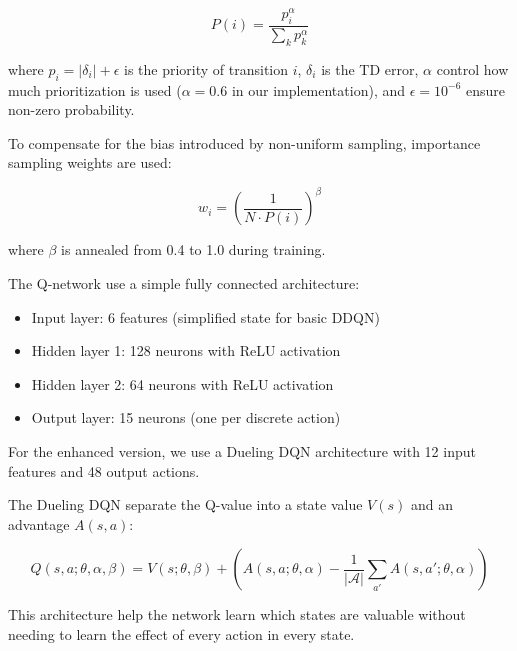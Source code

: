 \documentclass[12pt,a4paper]{article}
\begin{document}
\begin{equation}
    P(i) = \frac{p_i^{\alpha}}{\sum_k p_k^{\alpha}}
    \label{eq:per_prob}
\end{equation}

where $p_i = |\delta_i| + \epsilon$ is the priority of transition $i$, $\delta_i$ is the TD error, $\alpha$ control how much prioritization is used ($\alpha = 0.6$ in our implementation), and $\epsilon = 10^{-6}$ ensure non-zero probability.

To compensate for the bias introduced by non-uniform sampling, importance sampling weights are used:

\begin{equation}
    w_i = \left(\frac{1}{N \cdot P(i)}\right)^{\beta}
    \label{eq:is_weights}
\end{equation}

where $\beta$ is annealed from 0.4 to 1.0 during training.


The Q-network use a simple fully connected architecture:

\begin{itemize}
    \item Input layer: 6 features (simplified state for basic DDQN)
    \item Hidden layer 1: 128 neurons with ReLU activation
    \item Hidden layer 2: 64 neurons with ReLU activation
    \item Output layer: 15 neurons (one per discrete action)
\end{itemize}

For the enhanced version, we use a Dueling DQN architecture with 12 input features and 48 output actions.


The Dueling DQN separate the Q-value into a state value $V(s)$ and an advantage $A(s, a)$:

\begin{equation}
    Q(s, a; \theta, \alpha, \beta) = V(s; \theta, \beta) + \left(A(s, a; \theta, \alpha) - \frac{1}{|\mathcal{A}|}\sum_{a'} A(s, a'; \theta, \alpha)\right)
    \label{eq:dueling}
\end{equation}

This architecture help the network learn which states are valuable without needing to learn the effect of every action in every state.
\end{document}
